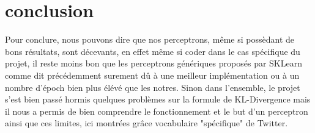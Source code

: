 \section{conclusion}

Pour conclure, nous pouvons dire que nos perceptrons, même si possèdant de bons résultats, sont décevants, en effet même si coder dans le cas spécifique du projet, il reste moins bon que les perceptrons génériques proposés par SKLearn comme dit précédemment surement dû à une meilleur implémentation ou à un nombre d'époch bien plus élévé que les notres. Sinon dans l'ensemble, le projet s'est bien passé hormis quelques problèmes sur la formule de KL-Divergence mais il nous a permis de bien comprendre le fonctionnement et le but d'un perceptron ainsi que ces limites, ici montrées grâce vocabulaire "spécifique" de Twitter. 
